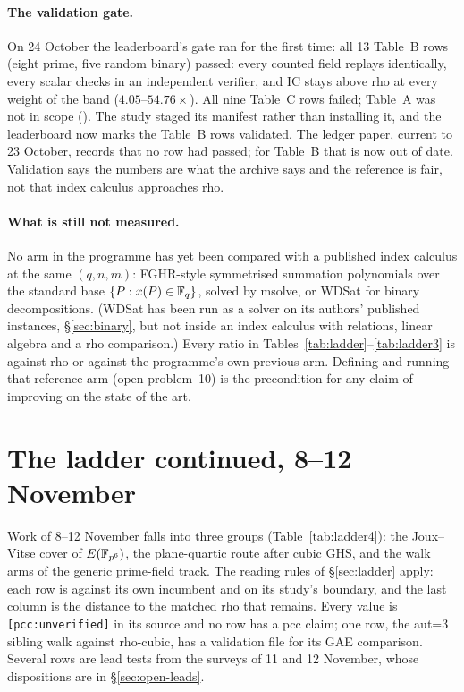 \paragraph{The validation gate.} On 24 October the leaderboard's gate ran
for the first time: all 13 Table~B rows (eight prime, five random binary)
passed: every counted field replays identically, every scalar checks in an
independent verifier, and IC stays above rho at every weight of the band
($4.05$--$54.76\times$). All nine Table~C rows failed; Table~A was not
in scope (). The study staged its
manifest rather than installing it, and the leaderboard now marks the
Table~B rows validated. The ledger paper, current to 23 October, records
that no row had passed; for Table~B that is now out of date. Validation
says the numbers are what the archive says and the reference is fair, not
that index calculus approaches rho.

\paragraph{What is still not measured.} No arm in the programme has yet
been compared with a published index calculus at the same $(q,n,m)$:
FGHR-style symmetrised summation polynomials over the standard base
$\{P: x(P)\in\mathbb{F}_q\}$, solved by msolve, or WDSat for binary
decompositions. (WDSat has been run as a solver on its authors' published
instances, \S\ref{sec:binary}, but not inside an index calculus with
relations, linear algebra and a rho comparison.) Every ratio in Tables~\ref{tab:ladder}--\ref{tab:ladder3} is
against rho or against the programme's own previous arm. Defining and running
that reference arm (open problem~10) is the precondition for any claim of
improving on the state of the art.

\section{The ladder continued, 8--12 November}\label{sec:ladder4}

Work of 8--12 November falls into three groups
(Table~\ref{tab:ladder4}): the Joux--Vitse cover of $E(\mathbb{F}_{p^6})$, the
plane-quartic route after cubic GHS, and the walk arms of the generic
prime-field track. The reading rules of \S\ref{sec:ladder} apply: each row
is against its own incumbent and on its study's boundary, and the last
column is the distance to the matched rho that remains. Every value is
\texttt{[pcc:unverified]} in its source and no row has a pcc claim; one
row, the aut=3 sibling walk against rho-cubic, has a validation file for
its GAE comparison. Several rows are lead tests from the surveys of 11 and
12 November, whose dispositions are in \S\ref{sec:open-leads}.

